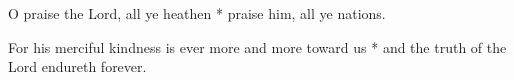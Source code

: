 \begin{multicols}{2}
	
	O praise the Lord, all ye heathen * praise him, all ye nations.
	
	For his merciful kindness is ever more and more toward us * and the truth of the Lord endureth forever.
	
	\gloria{}
\end{multicols}